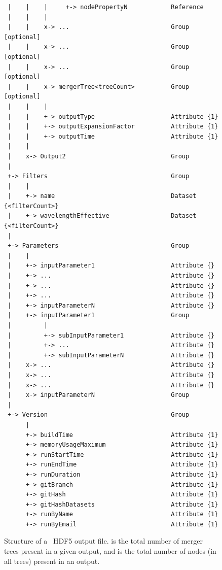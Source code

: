 \begin{figure}
\begin{center}
\begin{verbatim}
 |    |    |     +-> nodePropertyN            Reference
 |    |    |
 |    |    x-> ...                            Group              [optional]
 |    |    x-> ...                            Group              [optional]
 |    |    x-> ...                            Group              [optional]
 |    |    x-> mergerTree<treeCount>          Group              [optional]
 |    |    |
 |    |    +-> outputType                     Attribute {1}
 |    |    +-> outputExpansionFactor          Attribute {1}
 |    |    +-> outputTime                     Attribute {1}
 |    |
 |    x-> Output2                             Group
 |
 +-> Filters                                  Group
 |    |
 |    +-> name                                Dataset   {<filterCount>}
 |    +-> wavelengthEffective                 Dataset   {<filterCount>}
 |
 +-> Parameters                               Group
 |    |
 |    +-> inputParameter1                     Attribute {}
 |    +-> ...                                 Attribute {}
 |    +-> ...                                 Attribute {}
 |    +-> ...                                 Attribute {}
 |    +-> inputParameterN                     Attribute {}
 |    +-> inputParameter1                     Group
 |         |
 |         +-> subInputParameter1             Attribute {}
 |         +-> ...                            Attribute {}
 |         +-> subInputParameterN             Attribute {}
 |    x-> ...                                 Attribute {}
 |    x-> ...                                 Attribute {}
 |    x-> ...                                 Attribute {}
 |    x-> inputParameterN                     Group
 |
 +-> Version                                  Group
      |
      +-> buildTime                           Attribute {1}
      +-> memoryUsageMaximum                  Attribute {1}
      +-> runStartTime                        Attribute {1}
      +-> runEndTime                          Attribute {1}
      +-> runDuration                         Attribute {1}
      +-> gitBranch                           Attribute {1}
      +-> gitHash                             Attribute {1}
      +-> gitHashDatasets                     Attribute {1}
      +-> runByName                           Attribute {1}
      +-> runByEmail                          Attribute {1}
\end{verbatim}
\end{center}
\caption{Structure of a \glc\ HDF5 output file.  is the total number of merger trees present in a given output, and  is the total number of nodes (in all trees) present in an output.}
\label{fig:glcOutputFileStructure}
\end{figure}

